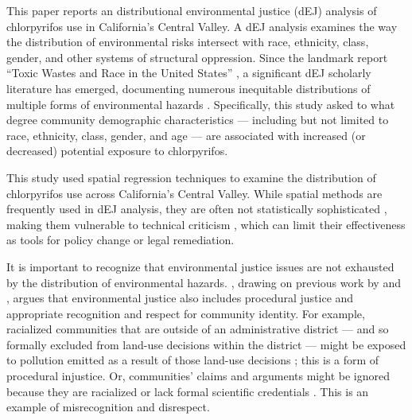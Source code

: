 \documentclass[ijerph,article,submit,oneauthor,pdftex]{Definitions/mdpi}
\begin{document}
This paper reports an distributional environmental justice (dEJ) analysis of chlorpyrifos use in California's Central Valley. A dEJ analysis examines the way the distribution of environmental risks intersect with race, ethnicity, class, gender, and other systems of structural oppression. Since the landmark report ``Toxic Wastes and Race in the United States'' \citep{CommissionforRacialJusticeToxicWastesRace1987}, a significant dEJ scholarly literature has emerged, documenting numerous inequitable distributions of multiple forms of environmental hazards \citep{PulidoEnvironmentalismEconomicJustice1996, Shrader-FrechetteEnvironmentalJusticeCreating2002, BrownToxicExposuresContested2007, MohaiEnvironmentalJustice2009, OttingerTechnoscienceEnvironmentalJustice2011, TaylorToxicCommunitiesEnvironmental2014}. Specifically, this study asked to what degree community demographic characteristics --- including but not limited to race, ethnicity, class, gender, and age --- are associated with increased (or decreased) potential exposure to chlorpyrifos.

This study used spatial regression techniques to examine the distribution of chlorpyrifos use across California's Central Valley. While spatial methods are frequently used in dEJ analysis, they are often not statistically sophisticated \citep{MohaiEnvironmentalJustice2009, ChakrabortyRevisitingToblerFirst2011}, making them vulnerable to technical criticism \citep{OreskesMerchantsDoubtHow2011, SteelEnvironmentalJusticeValues2012}, which can limit their effectiveness as tools for policy change or legal remediation.

It is important to recognize that environmental justice issues are not exhausted by the distribution of environmental hazards. \citet{SchlosbergDefiningEnvironmentalJustice2007}, drawing on previous work by \citet{YoungJusticePoliticsDifference1990} and \citet{Shrader-FrechetteEnvironmentalJusticeCreating2002}, argues that environmental justice also includes procedural justice and appropriate recognition and respect for community identity. For example, racialized communities that are outside of an administrative district --- and so formally excluded from land-use decisions within the district --- might be exposed to pollution emitted as a result of those land-use decisions \citep{LondonStruggleWaterJustice2018}; this is a form of procedural injustice. Or, communities' claims and arguments might be ignored because they are racialized or lack formal scientific credentials \citep{OttingerBucketsResistanceStandards2010}. This is an example of misrecognition and disrespect.
\end{document}
